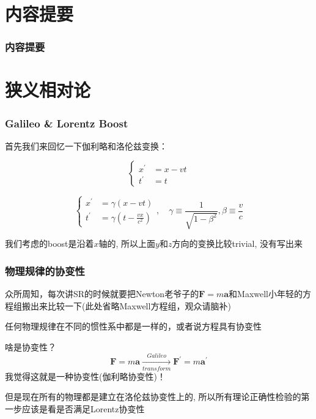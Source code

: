 \documentclass{whu-beamer}
\begin{document}
\maketitle


\section{内容提要}

\begin{frame}
  \frametitle{内容提要}
  \tableofcontents[hideallsubsections]
\end{frame}



\section{狭义相对论}

\begin{frame}
  \frametitle{Galileo \& Lorentz \alert{Boost}}
  首先我们来回忆一下伽利略和洛伦兹变换：\pause
  \begin{definition}[伽利略变换]
    \begin{equation}
    \left\{
    \begin{aligned}
      x^\prime & =  x-vt \\
      t^\prime & =  t 
    \end{aligned}
    \right.
    \end{equation}
  \end{definition}
  \pause
  \begin{definition}[洛伦兹变换]
    \begin{equation}
    \left\{
    \begin{aligned}
      x^\prime & =  \gamma\left(x-vt\right) \\
      t^\prime & =  \gamma\left(t-\frac{vx}{c^2}\right) 
    \end{aligned}
    \right.
    ,\quad \gamma\equiv\frac{1}{\sqrt{1-\beta^2}},\beta\equiv\frac{v}{c}
    \end{equation}
  \end{definition}
  \pause
  
  我们考虑的boost是沿着$x$轴的, 所以上面$y$和$z$方向的变换比较trivial, 没有写出来
\end{frame}

\begin{frame}
  \frametitle{物理规律的协变性}
  众所周知，每次讲SR的时候就要把Newton老爷子的\alert{$\mathbf{F}=m\mathbf{a}$}和Maxwell小年轻的方程组搬出来比较一下(此处省略Maxwell方程组，观众请脑补)\pause

  \begin{theorem}
    任何物理规律在不同的惯性系中都是一样的，或者说方程具有\alert{协变性}
  \end{theorem}
  \pause
  啥是协变性？\pause
  \[\mathbf{F}=m\mathbf{a}\xrightarrow[transform]{Galileo}\mathbf{F}^\prime=m\mathbf{a}^\prime\]
  我觉得这就是一种协变性(伽利略协变性)！\pause
  
  但是现在所有的物理都是建立在洛伦兹协变性上的, 所以所有理论正确性检验的第一步应该是看是否满足\alert{Lorentz}协变性
\end{frame}
\end{document}
